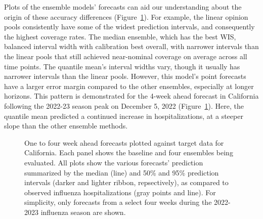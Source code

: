 \documentclass[
]{article}
\begin{document}
Plots of the ensemble models' forecasts can aid our understanding about
the origin of these accuracy differences
(Figure~\ref{fig-plot-forecasts-hubVis}). For example, the linear
opinion pools consistently have some of the widest prediction intervals,
and consequently the highest coverage rates. The median ensemble, which
has the best WIS, balanced interval width with calibration best overall,
with narrower intervals than the linear pools that still achieved
near-nominal coverage on average across all time points. The quantile
mean's interval widths vary, though it usually has narrower intervals
than the linear pools. However, this model's point forecasts have a
larger error margin compared to the other ensembles, especially at
longer horizons. This pattern is demonstrated for the 4-week ahead
forecast in California following the 2022-23 season peak on December 5,
2022 (Figure~\ref{fig-plot-forecasts-hubVis}). Here, the quantile mean
predicted a continued increase in hospitalizations, at a steeper slope
than the other ensemble methods.

\begin{figure}


\caption{\label{fig-plot-forecasts-hubVis}One to four week ahead
forecasts plotted against target data for California. Each panel shows
the baseline and four ensembles being evaluated. All plots show the
various forecasts' prediction summarized by the median (line) and 50\%
and 95\% prediction intervals (darker and lighter ribbon, repsectively),
as compared to observed influenza hospitalizations (gray points and
line). For simplicity, only forecasts from a select four weeks during
the 2022-2023 influenza season are shown.}

\end{figure}%
\end{document}
